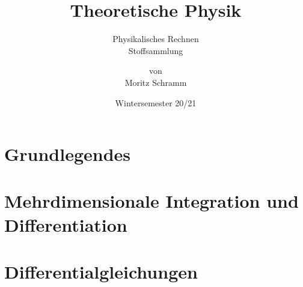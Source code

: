 \documentclass[a4paper, 12pt]{report}
\institute{Universität Bayreuth}
\title{Theoretische Physik}
\subtitle{Physikalisches Rechnen\\Stoffsammlung}
\author{von\\Moritz Schramm}%
\date{Wintersemester 20/21}
\begin{document}
    \maketitle
    \romantableofcontents

    \chapter{Grundlegendes}
    
    
    \chapter{Mehrdimensionale Integration und Differentiation}
    
    
	\chapter{Differentialgleichungen}
	
\end{document}
